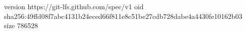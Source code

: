 version https://git-lfs.github.com/spec/v1
oid sha256:49ffd08f7abc4131b24eced66f811e8c51be27cdb728dabe4a4430fe10162b03
size 786528
